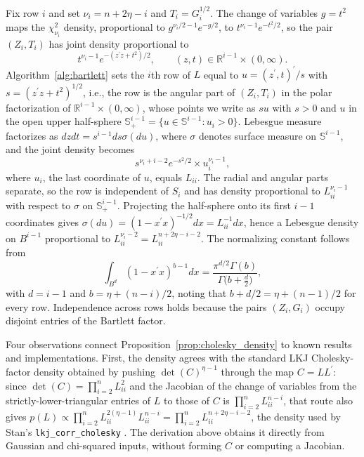 \documentclass[12pt,english]{article}
\makeatletter
\theoremstyle{plain} %
\theoremstyle{definition} %
\theoremstyle{remark} %
\renewenvironment{proof}[1][\proofname]{\par
  \pushQED{\qed}%
  \normalfont \topsep6\p@\@plus6\p@\relax
  \trivlist
  \item[\hskip\labelsep\bfseries#1:]\ignorespaces
}{%
  \popQED\endtrivlist\@endpefalse
}
\makeatother
\begin{document}
\begin{proof}
Fix row $i$ and set $\nu_i=n+2\eta-i$ and $T_i=G_i^{1/2}$. The change of variables $g=t^2$ maps the $\chi^2_{\nu_i}$ density, proportional to $g^{\nu_i/2-1}e^{-g/2}$, to $t^{\nu_i-1}e^{-t^2/2}$, so the pair $(Z_i,T_i)$ has joint density proportional to
$$
t^{\nu_i-1}e^{-(z^\prime z+t^2)/2},
\qquad
(z,t)\in\mathbb{R}^{i-1}\times(0,\infty).
$$
Algorithm~\ref{alg:bartlett} sets the $i$th row of $L$ equal to $u=(z^\prime,t)^\prime/s$ with $s=(z^\prime z+t^2)^{1/2}$, i.e., the row is the angular part of $(Z_i,T_i)$ in the polar factorization of $\mathbb{R}^{i-1}\times(0,\infty)$, whose points we write as $su$ with $s>0$ and $u$ in the open upper half-sphere $\mathbb{S}^{i-1}_+=\{u\in \mathbb{S}^{i-1}:u_i>0\}$. Lebesgue measure factorizes as $dzdt=s^{i-1}ds\sigma(du)$, where $\sigma$ denotes surface measure on $\mathbb{S}^{i-1}$, and the joint density becomes
$$
s^{\nu_i+i-2}e^{-s^2/2}\times u_i^{\nu_i-1},
$$
where $u_i$, the last coordinate of $u$, equals $L_{ii}$. The radial and angular parts separate, so the row is independent of $S_i$ and has density proportional to $L_{ii}^{\nu_i-1}$ with respect to $\sigma$ on $\mathbb{S}^{i-1}_+$. Projecting the half-sphere onto its first $i-1$ coordinates gives $\sigma(du)=(1-x^\prime x)^{-1/2}dx=L_{ii}^{-1}dx$, hence a Lebesgue density on $B^{i-1}$ proportional to $L_{ii}^{\nu_i-2}=L_{ii}^{n+2\eta-i-2}$. The normalizing constant follows from
$$
\int_{B^{d}}(1-x^\prime x)^{b-1}dx=\frac{\pi^{d/2}\Gamma(b)}{\Gamma\bigl(b+\frac{d}{2}\bigr)},
$$
with $d=i-1$ and $b=\eta+(n-i)/2$, noting that $b+d/2=\eta+(n-1)/2$ for every row. Independence across rows holds because the pairs $(Z_i,G_i)$ occupy disjoint entries of the Bartlett factor.
\end{proof}

Four observations connect Proposition~\ref{prop:cholesky_density} to known results and implementations.
First, the density agrees with the standard LKJ Cholesky-factor density obtained by pushing $\det(C)^{\eta-1}$ through the map $C=LL^\prime$: since $\det(C)=\prod_{i=2}^n L_{ii}^2$ and the Jacobian of the change of variables from the strictly-lower-triangular entries of $L$ to those of $C$ is $\prod_{i=2}^n L_{ii}^{n-i}$, that route also gives $p(L)\propto\prod_{i=2}^n L_{ii}^{2(\eta-1)}L_{ii}^{n-i}=\prod_{i=2}^n L_{ii}^{n+2\eta-i-2}$, the density used by Stan's \texttt{lkj\_corr\_cholesky} \citep{Carpenter:2017}. The derivation above obtains it directly from Gaussian and chi-squared inputs, without forming $C$ or computing a Jacobian.
\end{document}
